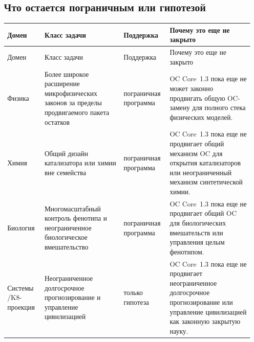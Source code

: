 \subsection{Что остается пограничным или гипотезой}
\begingroup
\scriptsize
\setlength{\emergencystretch}{1.5em}
\setlength{\tabcolsep}{2pt}
\setlength{\LTleft}{0pt}
\setlength{\LTright}{0pt}
\begin{longtable}{@{}L{0.11\textwidth}L{0.19\textwidth}L{0.14\textwidth}L{0.48\textwidth}@{}}
\toprule
Домен & Класс задачи & Поддержка & Почему это еще не закрыто \\
\midrule
\endfirsthead
\toprule
Домен & Класс задачи & Поддержка & Почему это еще не закрыто \\
\midrule
\endhead
Физика & Более широкое расширение микрофизических законов за пределы продвигаемого пакета остатков & пограничная программа & OC Core~1.3 пока еще не может законно продвигать общую OC-замену для полного стека физических моделей. \\
Химия & Общий дизайн катализатора или химии вне семейства & пограничная программа & OC Core~1.3 пока еще не продвигает общий механизм OC для открытия катализаторов или неограниченный механизм синтетической химии. \\
Биология & Многомасштабный контроль фенотипа и неограниченное биологическое вмешательство & пограничная программа & OC Core~1.3 пока еще не продвигает общий OC для биологических вмешательств или управления целым фенотипом. \\
Системы /\allowbreak K8-проекция & Неограниченное долгосрочное прогнозирование и управление цивилизацией & только гипотеза & OC Core~1.3 пока еще не продвигает неограниченное долгосрочное прогнозирование или управление цивилизацией как законную закрытую науку. \\
\bottomrule
\end{longtable}
\endgroup
